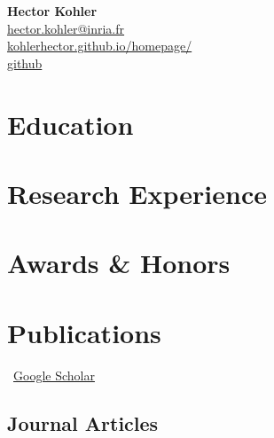 \documentclass[11pt]{article} %
\newcommand{\mytitle}[4]{
  \begin{center}
    \Large\textbf{#1}\normalsize \\ %
    \href{mailto:#2}{#2} \\ %
    \href{https://#3}{#3} \\ %
    #4 %
  \end{center}
}
\begin{document}
\mytitle{Hector Kohler}{hector.kohler@inria.fr}{kohlerhector.github.io/homepage/}{\href{https://github.com/KohlerHECTOR/}{github}} %


\RaggedRight


\section*{Education}


\section*{Research Experience}
\label{exp_research}


\section*{Awards \& Honors}
\label{awards}



\section*{Publications}
\label{pubs}

\vspace{-.75em}
\small
\faGoogle~\href{https://scholar.google.com/citations?user=aSO7bZ0AAAAJ&hl=en}{Google Scholar}\\
\normalsize


\subsection*{Journal Articles}
\label{journal-article}
\newrefcontext[labelprefix=J] %
\nocite{*}%
\printbibliography[
    type=article, %
    heading=none, %
    resetnumbers=true, %
    keyword=J %
]
\end{document}
